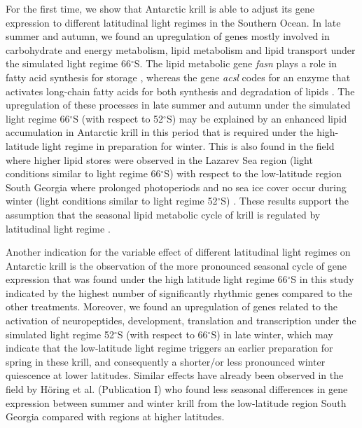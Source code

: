 For the first time, we show that Antarctic krill is able to adjust its gene
expression to different latitudinal light regimes in the Southern Ocean. In
late summer and autumn, we found an upregulation of genes mostly involved in
carbohydrate and energy metabolism, lipid metabolism and lipid transport under
the simulated light regime 66$^{\circ}$S. The lipid metabolic gene \textit{fasn}
plays a role in fatty acid synthesis for storage
\citep{chirala_structure_2004}, whereas the gene \textit{acsl} codes for an
enzyme that activates long-chain fatty acids for both synthesis and degradation
of lipids \citep{mashek_long-chain_2007}. The upregulation of these processes
in late summer and autumn under the simulated light regime 66$^{\circ}$S (with
respect to 52$^{\circ}$S) may be explained by an enhanced lipid accumulation in
Antarctic krill in this period that is required under the high-latitude light
regime in preparation for winter. This is also found in the field where higher
lipid stores were observed in the Lazarev Sea region (light conditions similar
to light regime 66$^{\circ}$S) with respect to the low-latitude region South
Georgia where prolonged photoperiods and no sea ice cover occur during winter
(light conditions similar to light regime 52$^{\circ}$S)
\citep{schmidt_feeding_2014}. These results support the assumption that the
seasonal lipid metabolic cycle of krill is regulated by latitudinal light
regime \citep{horing_light_2018}. 

Another indication for the variable effect of different latitudinal light
regimes on Antarctic krill is the observation of the more pronounced seasonal
cycle of gene expression that was found under the high latitude light regime
66$^{\circ}$S in this study indicated by the highest number of significantly
rhythmic genes compared to the other treatments.  Moreover, we found an
upregulation of genes related to the activation of neuropeptides, development,
translation and transcription under the simulated light regime 52$^{\circ}$S
(with respect to 66$^{\circ}$S) in late winter, which may indicate that the
low-latitude light regime triggers an earlier preparation for spring in these
krill, and consequently a shorter/or less pronounced winter quiescence at lower
latitudes. Similar effects have already been observed in the field by Höring et
al. (Publication I) who found less seasonal differences in gene expression between
summer and winter krill from the low-latitude region South Georgia compared
with regions at higher latitudes.

